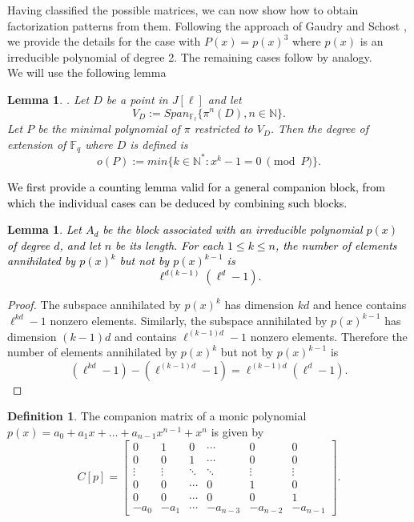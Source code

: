 \documentclass[11pt,a4paper]{article}
\theoremstyle{plain}
\newtheorem{lemma}[theorem]{Lemma}
\theoremstyle{definition}
\newtheorem{defi}[theorem]{Definition}
\theoremstyle{remark}
\newcommand{\verde}[1]{\textcolor{black}{#1}}
\newcommand{\azul}[1]{\textcolor{black}{#1}}
\newcommand{\F}{\ensuremath{\mathbb{F}}}%
\begin{document}
Having classified the possible matrices, we can now show how to obtain factorization patterns from them.
 Following the approach of Gaudry and Schost \cite{GS05}, we provide the details for the case with  $P(x)=p(x)^3$ where $p(x)$ is  an irreducible polynomial of degree 2. The remaining cases follow by analogy. 
\\ 
We will use the following lemma
\begin{lemma}{ \cite[Lemma 1]{riquelme2016}.} \label{lemma:orbit} Let $D$ be a point in $J[\ell]$ and let $$V_D:=Span_{\F_\ell}\{\pi^n(D), n \in \mathbb{N} \}.$$ Let $P$ be the minimal polynomial of $\pi$ restricted to $V_D$. Then the degree of extension of $\F_q$ where $D$ is defined is $$o(P):=min\{k \in \mathbb{N}^*:x^k-1=0 \ \pmod{P} \}.$$\end{lemma}

 

\verde{ We first provide a counting lemma valid for a general companion block, from which the individual cases can be deduced by combining such blocks.}


\begin{lemma}\label{lemma:orbitlayers}
\azul{Let $A_d$ be the block associated with an irreducible polynomial
$p(x)$ of degree $d$, and let $n$ be its length.
For each $1\le k\le n$, the number of elements annihilated by
$p(x)^k$ but not by $p(x)^{k-1}$ is
\[
\ell^{d(k-1)}(\ell^d-1).
\]}
\end{lemma}
\begin{proof}
The subspace annihilated by $p(x)^k$ has dimension $kd$ and hence
contains $\ell^{kd}-1$ nonzero elements.
Similarly, the subspace annihilated by $p(x)^{k-1}$ has dimension
$(k-1)d$ and contains $\ell^{(k-1)d}-1$ nonzero elements.
Therefore the number of elements annihilated by $p(x)^k$ but not by
$p(x)^{k-1}$ is
\[
(\ell^{kd}-1)-(\ell^{(k-1)d}-1)
=
\ell^{(k-1)d}(\ell^d-1).
\]
\end{proof}



\begin{defi}
    The companion matrix of a monic polynomial $p(x)=a_0+a_1x+\ldots+a_{n-1}x^{n-1}+x^n$ is given by
$$C[p]=\begin{bmatrix}
0 & 1 & 0 & \cdots & 0 & 0 \\
0 & 0 & 1 & \cdots & 0 & 0 \\
\vdots & \vdots & \ddots & \ddots & \vdots & \vdots \\
0 & 0 & \cdots & 0 & 1 & 0 \\
0 & 0 & \cdots & 0 & 0 & 1 \\
-a_0 & -a_1 & \cdots & -a_{n-3} & -a_{n-2} & -a_{n-1}
\end{bmatrix}.$$
\end{defi}
\end{document}
